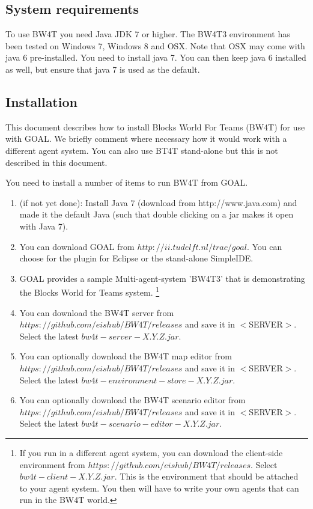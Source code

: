 \documentclass[11pt,a4paper]{article}
\begin{document}
\subsection{System requirements}
To use BW4T you need Java JDK 7 or higher. The BW4T3 environment has been tested on Windows 7, Windows 8 and OSX. Note that OSX may come with java 6 pre-installed. You need to install java 7. You can then keep java 6 installed as well, but ensure that java 7 is used as the default.

\subsection{Installation}
This document describes how to install Blocks World For Teams (BW4T) for use with GOAL. We briefly comment where necessary how it would work with a different agent system. You can also use BT4T stand-alone but this is not described in this document. 

You need to install a number of items to run BW4T from GOAL. 
\begin{enumerate}
 \item (if not yet done): Install Java 7 (download from http://www.java.com) and made it the default Java (such that double clicking on a jar makes it open with Java 7).
 \item You can download GOAL from $http://ii.tudelft.nl/trac/goal$. You can choose for the plugin for Eclipse or the stand-alone SimpleIDE.
 \item GOAL provides a sample Multi-agent-system 'BW4T3' that is demonstrating the Blocks World for Teams system. \footnote{If you run in a different agent system, you can download the client-side environment from $https://github.com/eishub/BW4T/releases$. Select $bw4t-client-X.Y.Z.jar$. This is the environment that should be attached to your agent system. You then will have to write your own agents that can run in the BW4T world.}
 \item You can download the BW4T server from $https://github.com/eishub/BW4T/releases$ and save it in $<$SERVER$>$. Select the latest $bw4t-server-X.Y.Z.jar$.
 \item You can optionally download the BW4T map editor from $https://github.com/eishub/BW4T/releases$ and save it in $<$SERVER$>$. Select the latest $bw4t-environment-store-X.Y.Z.jar$.
 \item You can optionally download the BW4T scenario editor from $https://github.com/eishub/BW4T/releases$ and save it in $<$SERVER$>$. Select the latest $bw4t-scenario-editor-X.Y.Z.jar$.
\end{enumerate}
  
\end{document}
